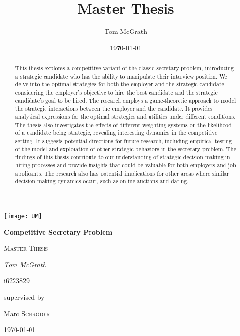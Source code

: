 \documentclass{article}
\title{Master Thesis}
\author{Tom McGrath}
\date{\today}
\begin{document}
\begin{titlepage}

	\centering
	
	\texttt{[image: UM]}\par\vspace{3cm}

	{\huge\bfseries Competitive Secretary Problem \par}
	
	{\scshape\Large Master Thesis \par}
	
	\vspace{2cm}
	
	{\Large\itshape	Tom McGrath  }

        i6223829
	
	\vfill
	
	supervised by\par
	Marc \textsc{Schröder}

	\vfill

	{\large \today\par}
	
\end{titlepage}

\begin{abstract}
This thesis explores a competitive variant of the classic secretary problem, introducing a strategic candidate who has the ability to manipulate their interview position. We delve into the optimal strategies for both the employer and the strategic candidate, considering the employer's objective to hire the best candidate and the strategic candidate's goal to be hired. The research employs a game-theoretic approach to model the strategic interactions between the employer and the candidate. It provides analytical expressions for the optimal strategies and utilities under different conditions. The thesis also investigates the effects of different weighting systems on the likelihood of a candidate being strategic, revealing interesting dynamics in the competitive setting. It suggests potential directions for future research, including empirical testing of the model and exploration of other strategic behaviors in the secretary problem. The findings of this thesis contribute to our understanding of strategic decision-making in hiring processes and provide insights that could be valuable for both employers and job applicants. The research also has potential implications for other areas where similar decision-making dynamics occur, such as online auctions and dating.
\end{abstract} 
\newpage
\tableofcontents
\thispagestyle{empty}
\listoffigures
\listoftables
\newpage
{}
\end{document}
